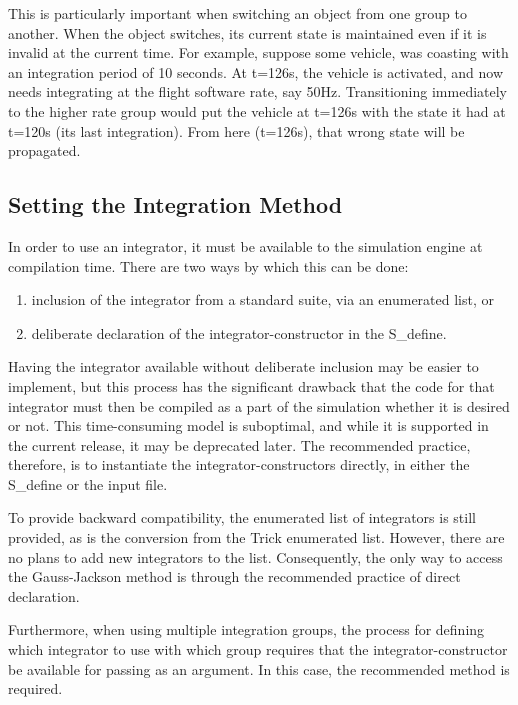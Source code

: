 This is particularly important when switching an object from one group to
another.  When the object switches, its current state is maintained even if it
is invalid at the current time.  For example, suppose some vehicle, was
coasting with an integration period of 10 seconds.  At t=126s, the vehicle is
activated, and now needs integrating at the flight software rate, say 50Hz.
Transitioning immediately to the higher rate group would put the vehicle at
t=126s with the state it had at t=120s (its last integration).  From here
(t=126s), that wrong state will be propagated.






\subsection{Setting the Integration Method}
\label{sec:user_simdev_integrator}

In order to use an integrator, it must be available to the simulation engine
at compilation time.  There are two ways by which this can be done:
\begin{enumerate}
 \item inclusion of the integrator from a standard suite, via an enumerated
 list, or
 \item deliberate declaration of the integrator-constructor in the S\_define.
\end{enumerate}

Having the integrator available without deliberate inclusion may be easier to
implement, but this process has the significant drawback that
the code for that integrator must then be compiled as a part of the simulation
whether it is desired or not.  This time-consuming model is suboptimal, and
while it is supported in the current release, it may be deprecated later.  The
recommended practice, therefore, is to instantiate the integrator-constructors
directly, in either the S\_define or the input file.

To provide backward compatibility, the enumerated list of integrators is still
provided, as is the conversion from the Trick enumerated list.  However, there
are no plans to add new integrators to the list.  Consequently, the only way
to access the Gauss-Jackson method is through the recommended practice of
direct declaration.

Furthermore, when using multiple integration groups, the process for defining
which integrator to use with which group requires that the
integrator-constructor be
available for passing as an argument.  In this case, the
recommended method is required.

